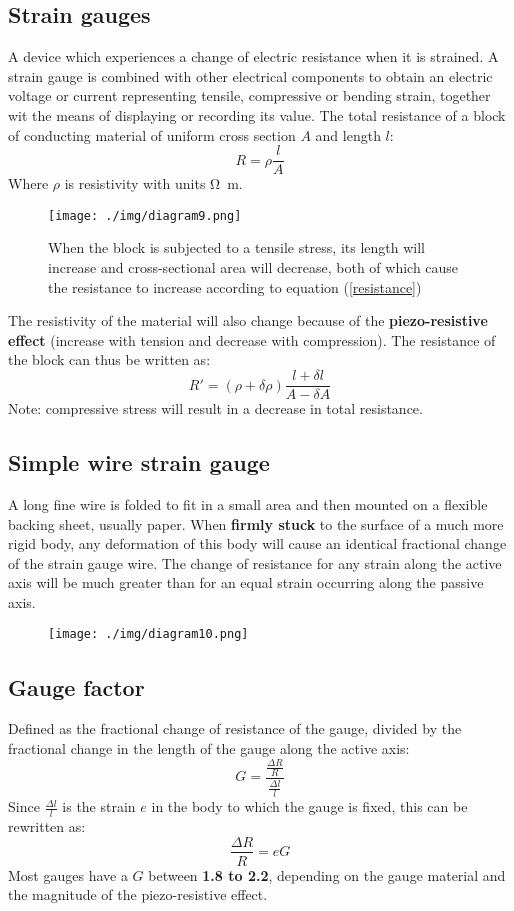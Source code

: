 \subsection{Strain gauges}
A device which experiences a change of electric resistance when it is strained. A strain gauge is combined with other electrical components to obtain an electric voltage or current representing tensile, compressive or bending strain, together wit the means of displaying or recording its value. The total resistance of a block of conducting material of uniform cross section $A$ and length $l$:
\begin{equation}
  R = \rho \frac{l}{A}
  \label{resistance}
\end{equation}
Where $\rho$ is resistivity with units \si{\ohm \meter}.
\begin{figure}[H]
  \centering
  \texttt{[image: ./img/diagram9.png]}
  \caption{When the block is subjected to a tensile stress, its length will increase and cross-sectional area will decrease, both of which cause the resistance to increase according to equation (\ref{resistance})}
\end{figure}
The resistivity of the material will also change because of the \textbf{piezo-resistive effect} (increase with tension and decrease with compression). The resistance of the block can thus be written as:
\begin{equation}
  R' = (\rho + \delta \rho) \frac{l + \delta l}{A - \delta A}
\end{equation}
Note: compressive stress will result in a decrease in total resistance.
\subsection{Simple wire strain gauge}
A long fine wire is folded to fit in a small area and then mounted on a flexible backing sheet, usually paper. When \textbf{firmly stuck} to the surface of a much more rigid body, any deformation of this body will cause an identical fractional change of the strain gauge wire. The change of resistance for any strain along the active axis will be much greater than for an equal strain occurring along the passive axis.
\begin{figure}[H]
  \centering
  \texttt{[image: ./img/diagram10.png]}
\end{figure}
\subsection{Gauge factor}
Defined as the fractional change of resistance of the gauge, divided by the fractional change in the length of the gauge along the active axis:
\begin{equation}
  G = \frac{\frac{\Delta R}{R}}{\frac{\Delta l}{l}}
\end{equation}
Since $\frac{\Delta l}{l}$ is the strain $e$ in the body to which the gauge is fixed, this can be rewritten as:
\begin{equation}
  \frac{\Delta R}{R} = eG
\end{equation}
Most gauges have a $G$ between \textbf{1.8 to 2.2}, depending on the gauge material and the magnitude of the piezo-resistive effect.
